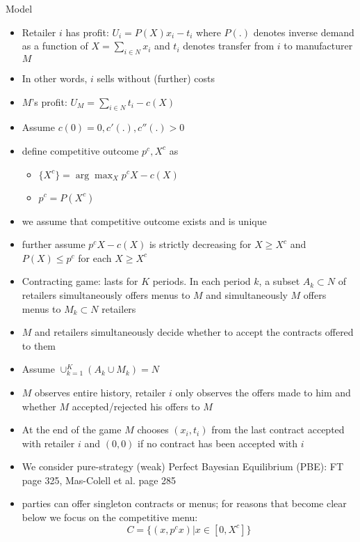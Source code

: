 \documentclass[11pt,english]{beamer}
\begin{document}
\begin{frame}[allowframebreaks]{Model}
  \begin{itemize}
  \item Retailer $i$ has profit: $U_i = P(X)x_i -t_i$ where $P(.)$
    denotes inverse demand as a function of $X= \sum_{i \in N} x_i$
    and $t_i$ denotes transfer from $i$ to manufacturer $M$
  \item In other words, $i$ sells without (further) costs
  \item $M$'s profit: $U_M = \sum_{i \in N} t_i - c(X)$
  \item Assume $c(0)=0,c'(.),c''(.) >0$
  \item define competitive outcome $p^c,X^c$ as
    \begin{itemize}
    \item $\{X^c\} = \arg\max_X p^c X - c(X)$
    \item $p^c = P(X^c)$
    \end{itemize}
  \item we assume that competitive outcome exists and is unique
  \item further assume $p^c X-c(X)$ is strictly decreasing for $X \geq
    X^c$ and $P(X) \leq p^c$ for each $X \geq X^c$
  \item Contracting game: lasts for $K$ periods. In each period $k$, a
    subset $A_k \subset N$ of retailers simultaneously offers menus to $M$ and
    simultaneously $M$ offers menus to $M_k \subset N$ retailers
  \item $M$ and retailers simultaneously decide whether to accept the
    contracts offered to them
  \item Assume $\cup_{k=1}^K (A_k \cup M_k) =N$
  \item $M$ observes entire history, retailer $i$ only observes the
    offers made to him and whether $M$ accepted/rejected his offers to $M$
  \item At the end of the game $M$ chooses $(x_i,t_i)$ from the last
    contract accepted with retailer $i$ and $(0,0)$ if no contract has
    been accepted with $i$
  \item We consider pure-strategy (weak) Perfect Bayesian Equilibrium
    (PBE): FT page 325, Mas-Colell et al. page 285
  \item parties can offer singleton contracts or menus; for reasons
    that become clear below we focus on the competitive menu:
    \begin{equation}
      \label{eq:CompMenuC}
      C = \{ (x,p^c x)|x \in [0,X^c] \}

\end{equation}
\end{itemize}
\end{frame}
\end{document}
